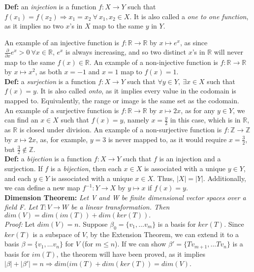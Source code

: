 \documentclass[12pt]{article}
\begin{document}
\textbf{Def: }an \emph{injection} is a function $f: X \rightarrow Y$ such that $f(x_1) = f(x_2)\Rightarrow x_1 = x_2\ \forall\ x_1, x_2 \in X$. It is also called a \emph{one to one function}, as it implies no two $x$'s in $X$ map to the same $y$ in $Y$. 

An example of an injective function is $f: \mathbb{R} \rightarrow \mathbb{R}$ by $x \mapsto e^{x}$, as since $\frac{\partial}{\partial x}e^x  > 0\ \forall x \in \mathbb{R}$, $e^x$ is always increasing, and so two distinct $x$'s in $\mathbb{R}$ will never map to the same $f(x) \in \mathbb{R}$. An example of a non-injective function is $f: \mathbb{R} \rightarrow \mathbb{R}$ by $x \mapsto x^2$, as both $x = -1$ and $x = 1$ map to $f(x) = 1$. \\

\textbf{Def: }a \emph{surjection} is a function $f: X \rightarrow Y$ such that $\forall y \in Y,\ \exists x \in X$ such that $f(x) = y$. It is also called \emph{onto}, as it implies every value in the codomain is mapped to. Equivalently, the range or image is the same set as the codomain.\\

An example of a surjective function is $f: \mathbb{R} \rightarrow \mathbb{R}$ by $x \mapsto 2x$, as for any $y \in Y$, we can find an $x \in X$ such that $f(x) = y$, namely $x = \frac{y}{2}$ in this case, which is in $\mathbb{R}$, as $\mathbb{R}$ is closed under division. An example of a non-surjective function is $f: \mathbb{Z} \rightarrow \mathbb{Z}$ by $x \mapsto 2x$, as, for example, $y = 3$ is never mapped to, as it would require $x = \frac{3}{2}$, but $\frac{3}{2} \notin \mathbb{Z}$.\\

\textbf{Def: }a \emph{bijection} is a function $f: X \rightarrow Y$ such that $f$ is an injection and a surjection. If $f$ is a \emph{bijection}, then each $x \in X$ is associated with a unique $y \in Y$, and each $y \in Y$ is associated with a unique $x \in X$. Thus, $|X| = |Y|$. Additionally, we can define a new map $f^{-1}: Y \rightarrow X$ by $y \mapsto x$ if $f(x) = y$.\\

\textbf{Dimension Theorem: }\emph{Let V and W be finite dimensional vector spaces over a field F. Let $T: V \rightarrow W$ be a linear transformation. Then $dim(V) = dim(im(T)) + dim(ker(T)).$}\\

\emph{Proof: }Let $dim(V) = n$. Suppose $\beta_0 = \{ v_1, \dots v_m \}$ is a basis for $ker(T)$. Since $ker(T)$ is a subspace of $V$, by the Extension Theorem, we can extend it to a basis $\beta = \{ v_1, \dots v_n \}$ for $V$ (for $m \leq n$). If we can show $\beta' = \{ Tv_{m + 1}, \dots Tv_{n}\}$ is a basis for $im(T)$, the theorem will have been proved, as it implies $|\beta| + |\beta'| = n \Rightarrow dim(im(T) + dim(ker(T)) = dim(V)$.\\
\end{document}
